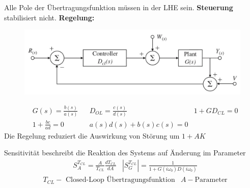 \begin{tcolorbox}[colback=white!10!white,colframe=green!30!black,title=Stabilität] 
Alle Pole der Übertragungsfunktion müssen in der LHE sein. \textbf{Steuerung} stabilisiert nicht. 
\textbf{Regelung:}

	\begin{figure}[H]
		\centering
		\includegraphics[width=.7\textwidth]{content/img/regler}
\end{figure}
	\begin{align*}
	&G(s) = \frac{b(s)}{a(s)}  && D_{OL} = \frac{c(s)}{d(s)}
	&1+ G D_{CL} = 0\\ 
	&1 + \frac{bc}{ad} = 0  &&
	a(s)d(s) + b(s)c(s) = 0 
	\end{align*}
Die Regelung reduziert die Auswirkung von Störung um $1+ AK$

\end{tcolorbox}

\begin{tcolorbox}[colback=white!10!white,colframe=green!30!black,title=Sensitivität] 
	Sensitivität beschreibt die Reaktion des Systems auf Änderung im Parameter
	\begin{align*}
		& S_{A}^{T_{CL}} = \frac{A}{T_{CL}}\frac{d T_{CL}}{dA}
		& |S_{G}^{T_{CL}}| = \frac{1}{1+G(i\omega_0)D(i\omega_0)}
		\end{align*}
	\begin{align*}
		&T_{CL} -\text{ Closed-Loop Übertragungsfunktion} & A - \text{Parameter}
	\end{align*}
\end{tcolorbox}




